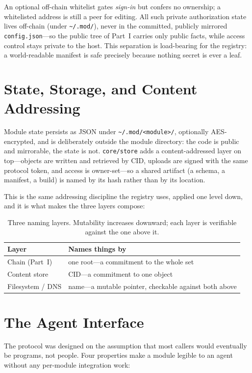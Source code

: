 \documentclass[11pt,a4paper]{article}
\begin{document}
An optional off-chain whitelist gates \emph{sign-in} but confers no ownership; a
whitelisted address is still a peer for editing. All such private authorization
state lives off-chain (under \texttt{\textasciitilde/.mod/}), never in the
committed, publicly mirrored \texttt{config.json}---so the public tree of Part~I
carries only public facts, while access control stays private to the host. This
separation is load-bearing for the registry: a world-readable manifest is safe
precisely because nothing secret is ever a leaf.

\section{State, Storage, and Content Addressing}

Module state persists as JSON under \texttt{\textasciitilde/.mod/<module>/},
optionally AES-encrypted, and is deliberately outside the module directory: the
code is public and mirrorable, the state is not. \texttt{core/store} adds a
content-addressed layer on top---objects are written and retrieved by CID,
uploads are signed with the same protocol token, and access is owner-set---so a
shared artifact (a schema, a manifest, a build) is named by its hash rather
than by its location.

This is the same addressing discipline the registry uses, applied one level
down, and it is what makes the three layers compose:

\begin{table}[H]
\centering
\begin{tabularx}{\textwidth}{lX}
\toprule
\textbf{Layer} & \textbf{Names things by} \\
\midrule
Chain (Part~I) & one root---a commitment to the whole set \\
Content store & CID---a commitment to one object \\
Filesystem / DNS & name---a mutable pointer, checkable against both above \\
\bottomrule
\end{tabularx}
\caption{Three naming layers. Mutability increases downward; each layer is
verifiable against the one above it.}
\end{table}

\section{The Agent Interface}

The protocol was designed on the assumption that most callers would eventually
be programs, not people. Four properties make a module legible to an agent
without any per-module integration work:
\end{document}
